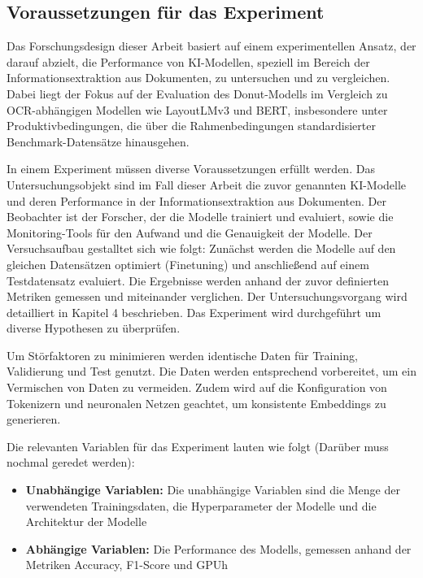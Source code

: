 \subsection{Voraussetzungen für das Experiment}
Das Forschungsdesign dieser Arbeit basiert auf einem experimentellen Ansatz, der darauf abzielt, die Performance von KI-Modellen, speziell im Bereich der Informationsextraktion aus Dokumenten, zu untersuchen und zu vergleichen. Dabei liegt der Fokus auf der Evaluation des Donut-Modells im Vergleich zu OCR-abhängigen Modellen wie LayoutLMv3 und BERT, insbesondere unter Produktivbedingungen, die über die Rahmenbedingungen standardisierter Benchmark-Datensätze hinausgehen.

In einem Experiment müssen diverse Voraussetzungen erfüllt werden. Das Untersuchungsobjekt sind im Fall dieser Arbeit die zuvor genannten KI-Modelle und deren Performance in der Informationsextraktion aus Dokumenten. Der Beobachter ist der Forscher, der die Modelle trainiert und evaluiert, sowie die Monitoring-Tools für den Aufwand und die Genauigkeit der Modelle. Der Versuchsaufbau gestalltet sich wie folgt: Zunächst werden die Modelle auf den gleichen Datensätzen optimiert (Finetuning) und anschließend auf einem Testdatensatz evaluiert. Die Ergebnisse werden anhand der zuvor definierten Metriken gemessen und miteinander verglichen. Der Untersuchungsvorgang wird detailliert in Kapitel 4 beschrieben. Das Experiment wird durchgeführt um diverse Hypothesen zu überprüfen.

Um Störfaktoren zu minimieren werden identische Daten für Training, Validierung und Test genutzt. Die Daten werden entsprechend vorbereitet, um ein Vermischen von Daten zu vermeiden. Zudem wird auf die Konfiguration von Tokenizern und neuronalen Netzen geachtet, um konsistente Embeddings zu generieren.

Die relevanten Variablen für das Experiment lauten wie folgt (Darüber muss nochmal geredet werden):
\begin{itemize}
    \item \textbf{Unabhängige Variablen:} Die unabhängige Variablen sind die Menge der verwendeten Trainingsdaten, die Hyperparameter der Modelle und die Architektur der Modelle
    \item \textbf{Abhängige Variablen:} Die Performance des Modells, gemessen anhand der Metriken Accuracy, F1-Score und GPUh
\end{itemize}

